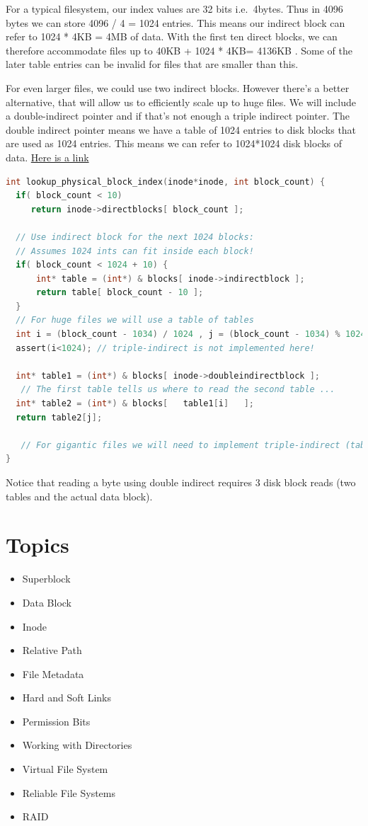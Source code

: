For a typical filesystem, our index values are 32 bits i.e.~4bytes. Thus in 4096 bytes we can store 4096 / 4 = 1024 entries. This means our indirect block can refer to 1024 * 4KB = 4MB of data. With the first ten direct blocks, we can therefore accommodate files up to 40KB + 1024 * 4KB= 4136KB . Some of the later table entries can be invalid for files that are smaller than this.

For even larger files, we could use two indirect blocks. However there's a better alternative, that will allow us to efficiently scale up to huge files. We will include a double-indirect pointer and if that's not enough a triple indirect pointer. The double indirect pointer means we have a table of 1024 entries to disk blocks that are used as 1024 entries. This means we can refer to 1024*1024 disk blocks of data. \href{http://uw714doc.sco.com/en/FS\_admin/graphics/s5chain.gif}{Here is a link}

\begin{lstlisting}[language=C]
int lookup_physical_block_index(inode*inode, int block_count) {
  if( block_count < 10)
     return inode->directblocks[ block_count ];

  // Use indirect block for the next 1024 blocks:
  // Assumes 1024 ints can fit inside each block!
  if( block_count < 1024 + 10) {   
      int* table = (int*) & blocks[ inode->indirectblock ];
      return table[ block_count - 10 ];
  }
  // For huge files we will use a table of tables
  int i = (block_count - 1034) / 1024 , j = (block_count - 1034) % 1024;
  assert(i<1024); // triple-indirect is not implemented here!

  int* table1 = (int*) & blocks[ inode->doubleindirectblock ];
   // The first table tells us where to read the second table ...
  int* table2 = (int*) & blocks[   table1[i]   ];
  return table2[j];
 
   // For gigantic files we will need to implement triple-indirect (table of tables of tables)
}
\end{lstlisting}

Notice that reading a byte using double indirect requires 3 disk block reads (two tables and the actual data block).

\section{Topics}\label{topics}

\begin{itemize}
\tightlist
\item
  Superblock
\item
  Data Block
\item
  Inode
\item
  Relative Path
\item
  File Metadata
\item
  Hard and Soft Links
\item
  Permission Bits
\item
  Working with Directories
\item
  Virtual File System
\item
  Reliable File Systems
\item
  RAID
\end{itemize}

